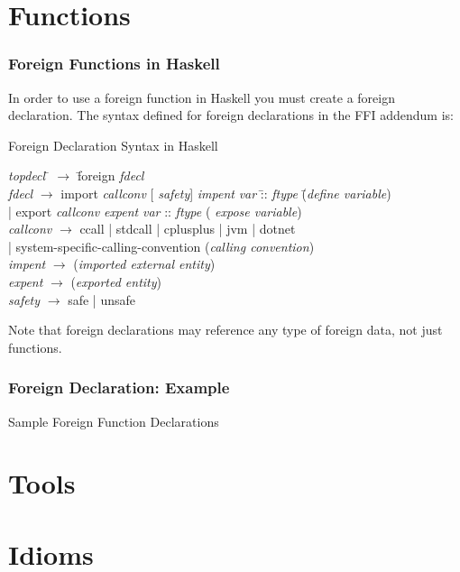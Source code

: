 \documentclass{beamer}
\begin{document}
\section{Functions}
\begin{frame}[fragile]
    \frametitle{Foreign Functions in Haskell}

    In order to use a foreign function in Haskell you must create a foreign
    declaration. The syntax defined for foreign declarations in the FFI addendum is:

    \begin{exampleblock}{Foreign Declaration Syntax in Haskell} \begin{tiny}
        \begin{tabbing} {\it topdecl}  \= $\rightarrow$ \= foreign {\it fdecl}
            \\ {\it fdecl}    \> $\rightarrow$ \> import \= {\it callconv} [{\it
            safety}] {\it impent} {\it var} \= :: \= {\it ftype} \= ({\it define
            variable})\\ \> |             \> export \> {\it callconv} {\it
            expent} {\it var} \> :: \> {\it ftype}                \> ({\it
            expose variable}) \\ {\it callconv} \> $\rightarrow$ \> ccall |
            stdcall | cplusplus | jvm | dotnet \\ \> |             \>
            system-specific-calling-convention \> \> \> \> ({\it calling
            convention})\\ {\it impent}   \> $\rightarrow$ \> [string] \> \> \>
            \> ({\it imported external entity}) \\ {\it expent}   \>
            $\rightarrow$ \> [string] \> \> \> \> ({\it exported entity}) \\
            {\it safety}   \> $\rightarrow$ \> safe | unsafe \end{tabbing}
        \end{tiny} \end{exampleblock}

    Note that foreign declarations may reference any type of foreign data, not
    just functions.
\end{frame}
\begin{frame}
    \frametitle{Foreign Declaration: Example}
    \begin{exampleblock}{Sample Foreign Function Declarations}
        
    \end{exampleblock}
\end{frame}

\section{Tools}

\section{Idioms}
\end{document}
